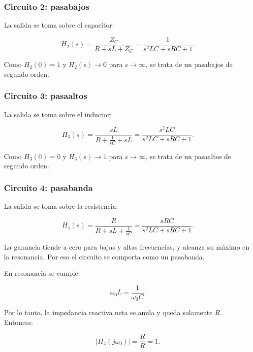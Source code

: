 \subsubsection{Circuito 2: pasabajos}

La salida se toma sobre el capacitor:

\begin{equation}
    H_2(s)=\frac{Z_C}{R+sL+Z_C}
    =\frac{1}{s^2LC+sRC+1}.
\end{equation}

Como $H_2(0)=1$ y $H_2(s)\to 0$ para $s\to\infty$, se trata de un pasabajos de segundo orden.

\subsubsection{Circuito 3: pasaaltos}

La salida se toma sobre el inductor:

\begin{equation}
    H_3(s)=\frac{sL}{R+\frac{1}{sC}+sL}
    =\frac{s^2LC}{s^2LC+sRC+1}.
\end{equation}

Como $H_3(0)=0$ y $H_3(s)\to 1$ para $s\to\infty$, se trata de un pasaaltos de segundo orden.

\subsubsection{Circuito 4: pasabanda}

La salida se toma sobre la resistencia:

\begin{equation}
    H_4(s)=\frac{R}{R+sL+\frac{1}{sC}}
    =\frac{sRC}{s^2LC+sRC+1}.
\end{equation}

La ganancia tiende a cero para bajas y altas frecuencias, y alcanza su máximo en la resonancia. Por eso el circuito se comporta como un pasabanda.

En resonancia se cumple:

\begin{equation}
    \omega_0 L=\frac{1}{\omega_0 C}.
\end{equation}

Por lo tanto, la impedancia reactiva neta se anula y queda solamente $R$. Entonces:

\begin{equation}
    |H_4(j\omega_0)|=\frac{R}{R}=1.
\end{equation}

